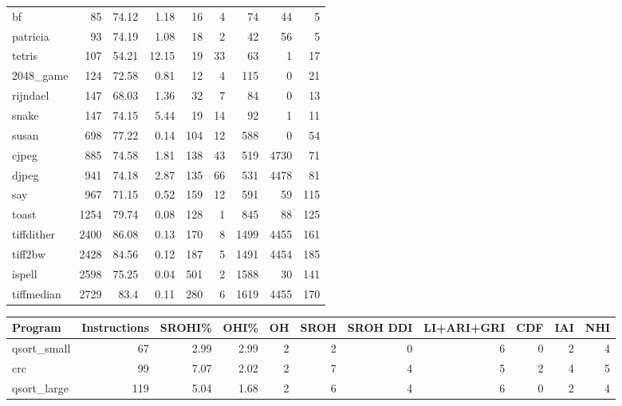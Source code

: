 \begin{tabular}{lrrrrrrrr}
 bf              &       85 &    74.12 &   1.18 &   16 &    4 &     74 &    44 &     5 \\
 patricia        &       93 &    74.19 &   1.08 &   18 &    2 &     42 &    56 &     5 \\
 tetris          &      107 &    54.21 &  12.15 &   19 &   33 &     63 &     1 &    17 \\
 2048\_game       &      124 &    72.58 &   0.81 &   12 &    4 &    115 &     0 &    21 \\
 rijndael        &      147 &    68.03 &   1.36 &   32 &    7 &     84 &     0 &    13 \\
 snake           &      147 &    74.15 &   5.44 &   19 &   14 &     92 &     1 &    11 \\
 susan           &      698 &    77.22 &   0.14 &  104 &   12 &    588 &     0 &    54 \\
 cjpeg           &      885 &    74.58 &   1.81 &  138 &   43 &    519 &  4730 &    71 \\
 djpeg           &      941 &    74.18 &   2.87 &  135 &   66 &    531 &  4478 &    81 \\
 say             &      967 &    71.15 &   0.52 &  159 &   12 &    591 &    59 &   115 \\
 toast           &     1254 &    79.74 &   0.08 &  128 &    1 &    845 &    88 &   125 \\
 tiffdither      &     2400 &    86.08 &   0.13 &  170 &    8 &   1499 &  4455 &   161 \\
 tiff2bw         &     2428 &    84.56 &   0.12 &  187 &    5 &   1491 &  4454 &   185 \\
 ispell          &     2598 &    75.25 &   0.04 &  501 &    2 &   1588 &    30 &   141 \\
 tiffmedian      &     2729 &    83.4  &   0.11 &  280 &    6 &   1619 &  4455 &   170 \\
\hline
\end{tabular}\begin{tabular}{lrrrrrrrrrr}
\hline
 Program         &   Instructions &   SROHI\% &   OHI\% &   OH &   SROH &   SROH DDI &   LI+ARI+GRI &   CDF &   IAI &   NHI \\
\hline
 qsort\_small     &             67 &     2.99 &   2.99 &    2 &      2 &          0 &            6 &     0 &     2 &     4 \\
 crc             &             99 &     7.07 &   2.02 &    2 &      7 &          4 &            5 &     2 &     4 &     5 \\
 qsort\_large     &            119 &     5.04 &   1.68 &    2 &      6 &          4 &            6 &     0 &     2 &     4 \\

\end{tabular}
